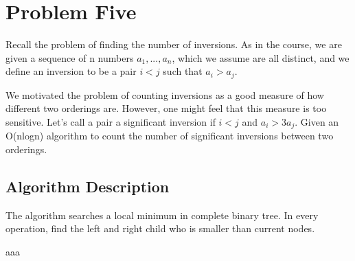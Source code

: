 \documentclass{article}
\begin{document}
\newpage
\section{Problem Five}
Recall the problem of finding the number of inversions. As in the course, we are given a sequence of n numbers $a_1,...,a_n$, which we assume are all distinct, and we define an inversion to be a pair $i < j$ such that $a_i > a_j$.

We motivated the problem of counting inversions as a good measure of how different two orderings are. However, one might feel that this measure is too sensitive. Let's call a pair a significant inversion if $i < j$ and $a_i > 3a_j$. Given an O(nlogn) algorithm to count the number of significant inversions between two orderings.


\subsection{Algorithm Description}

The algorithm searches a local minimum in complete binary tree. In every operation, find the left and right child who is smaller than current nodes.

\begin{algorithm}[htbp]  
  \caption{aaa}  
  \begin{algorithmic}[1] 
    \EndFunction  
  \end{algorithmic}  
\end{algorithm} 
\end{document}
